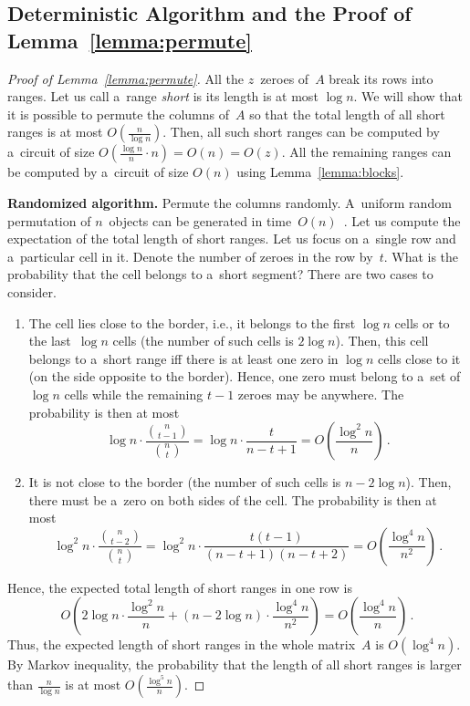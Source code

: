 \subsection{Deterministic Algorithm and the Proof of Lemma~\ref{lemma:permute}}\label{sec:deterministic}

\begin{proof}[Proof of Lemma~\ref{lemma:permute}]
All the $z$~zeroes of~$A$ break its rows into ranges.
Let us call a~range {\em short} is its length is at most $\log n$.
We will show that it is possible to permute the columns of~$A$
so that the total length of all short ranges is at most $O(\frac{n}{\log n})$.
Then, all such short ranges can be computed by a~circuit of size
$O(\frac{\log n}{n} \cdot n)=O(n)=O(z)$. All the remaining ranges can be
computed by a~circuit of size $O(n)$ using Lemma~\ref{lemma:blocks}.

\textbf{Randomized algorithm.}
Permute the columns randomly. A~uniform random permutation
of $n$~objects can be generated in
time~$O(n)$~\cite[Algorithm~P (Shuffling)]{DBLP:books/lib/Knuth98}.
Let us compute the expectation of
the total length of short ranges.
Let us focus on a~single row and a~particular cell in it. Denote the number of
zeroes in the row by~$t$. What is the probability that the cell belongs to
a~short segment? There are two cases to consider.
\begin{enumerate}
\item The cell lies close to the border, i.e., it belongs to
the first $\log n$ cells or to the last~$\log n$ cells
(the number of such cells is $2\log n$). Then,
this cell belongs to a~short range iff there is at least one zero
in $\log n$ cells close to it (on the side opposite to the border).
Hence, one zero must belong to a~set of $\log n$ cells while the remaining
$t-1$ zeroes may be anywhere. The probability is then at most
\[\log n \cdot \frac{\binom{n}{t-1}}{\binom{n}{t}}=\log n \cdot \frac{t}{n-t+1}=O\left(\frac{\log^2n}{n}\right) \, .\]
\item It is not close to the border (the number of such cells is $n-2\log n$).
Then, there must be a~zero on both sides of the cell. The probability is then
at most
\[\log^2 n \cdot \frac{\binom{n}{t-2}}{\binom{n}{t}}=\log^2n \cdot \frac{t(t-1)}{(n-t+1)(n-t+2)}=O\left(\frac{\log^4 n}{n^2}\right) \, .\]
\end{enumerate}
Hence, the expected total length of short ranges in one row is
\[O\left( 2\log n \cdot \frac{\log^2 n}{n} + (n-2\log n) \cdot \frac{\log^4 n}{n^2}\right)=O\left(\frac{\log^4 n}{n}\right) \, .\]
Thus, the expected length of short ranges in the whole
matrix~$A$ is $O(\log^4n)$. By Markov inequality, the probability that
the length of all short ranges is larger than $\frac{n}{\log n}$ is
at most $O(\frac{\log^5 n}{n})$.


\end{proof}
